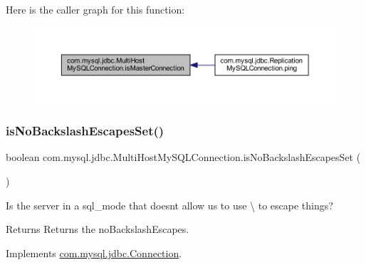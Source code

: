 Here is the caller graph for this function\+:
\nopagebreak
\begin{figure}[H]
\begin{center}
\leavevmode
\includegraphics[width=350pt]{classcom_1_1mysql_1_1jdbc_1_1_multi_host_my_s_q_l_connection_a63f3a1689c557f644de8accf62405885_icgraph}
\end{center}
\end{figure}
\mbox{\label{classcom_1_1mysql_1_1jdbc_1_1_multi_host_my_s_q_l_connection_a9647bf20f66e69d8a07a2f867957f7f2}} 
\subsubsection{\texorpdfstring{is\+No\+Backslash\+Escapes\+Set()}{isNoBackslashEscapesSet()}}
{\footnotesize\ttfamily boolean com.\+mysql.\+jdbc.\+Multi\+Host\+My\+S\+Q\+L\+Connection.\+is\+No\+Backslash\+Escapes\+Set (\begin{DoxyParamCaption}{ }\end{DoxyParamCaption})}

Is the server in a sql\+\_\+mode that doesn\textquotesingle{}t allow us to use \textbackslash{} to escape things?

\begin{DoxyReturn}{Returns}
Returns the no\+Backslash\+Escapes. 
\end{DoxyReturn}


Implements \mbox{\hyperlink{interfacecom_1_1mysql_1_1jdbc_1_1_connection_a3465592f69365c9572cc404ae04375b4}{com.\+mysql.\+jdbc.\+Connection}}.

